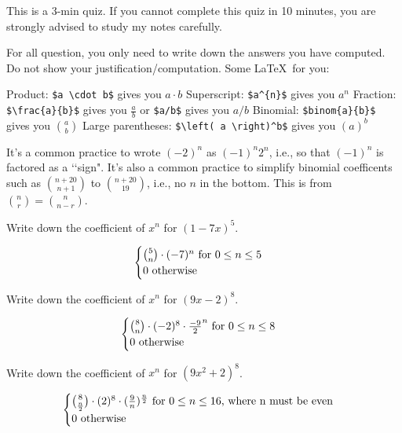 

\renewcommand\AUTHOR{nweadick1@cougars.ccis.edu} %


\topmattertwo

This is a 3-min quiz.
If you cannot complete this quiz in 10 minutes, you are strongly
advised to study my notes carefully.

For all question, you only need to write down the answers you have
computed. Do not show your justification/computation.
Some \LaTeX\ for you:
\begin{enumerate}[nosep]
\li Product: \verb!$a \cdot b$! gives you $a \cdot b$
\li Superscript: \verb!$a^{n}$! gives you $a^{n}$
\li Fraction: \verb!$\frac{a}{b}$! gives you $\frac{a}{b}$ or
\verb!$a/b$! gives you $a/b$ 
\li Binomial: \verb!$binom{a}{b}$! gives you $\binom{a}{b}$
\li Large parentheses:
\verb!$\left( a \right)^b$! gives you $\left( a \right)^b$ 
\end{enumerate}
It's a common practice to wrote $(-2)^n$ as $(-1)^n 2^n$, i.e.,
so that $(-1)^n$ is factored as a \lq\lq sign".
It's also a common practice to simplify binomial coefficents
such as $\binom{n + 20}{n + 1}$ to
$\binom{n + 20}{19}$,
i.e., no $n$ in the bottom.
This is from $\binom{n}{r} = \binom{n}{n - r}$.

\nextq
Write down the coefficient of $x^n$ for 
$(1 - 7x)^5$.
\\
\ANSWER
\begin{answerlong}
\[
\begin{cases}
$$\binom{5}{n} \cdot (-7)^n$$ \text{ for $0 \leq n \leq 5$} \\
$0$ \text{ otherwise}
\end{cases}
\]
\end{answerlong}

\nextq
Write down the coefficient of $x^n$ for 
$(9x - 2)^8$.
\\
\ANSWER

\begin{answerlong}
\[
\begin{cases}
$$\binom{8}{n} \cdot (-2)^8 \cdot \frac{-9}{2}^n$$ \text{ for $0 \leq n \leq 8$} \\
$0$ \text{ otherwise}
\end{cases}
\]
\end{answerlong}

\nextq
Write down the coefficient of $x^n$ for 
$(9x^2 + 2)^8$.
\\
\ANSWER
\begin{answerlong}
\[
\begin{cases}
$$\binom{8}{\frac{n}{2}} \cdot (2)^8 \cdot (\frac{9}{n})^\frac{n}{2}$$ \text{ for $0 \leq n \leq 16$, where n must be even} \\
$0$ \text{ otherwise}
\end{cases}
\]
\end{answerlong}

\newpage


